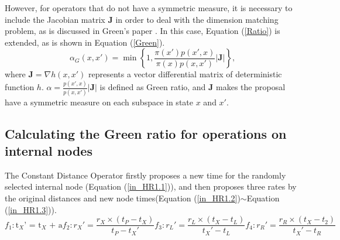 \documentclass{bmcart}
\begin{document}
\begin{backmatter}
However, for operators that do not have a symmetric measure, it is necessary to include the Jacobian matrix ${\mathbf{J}}$  in order to deal with the dimension matching problem, as is discussed in Green's paper \cite{green1995reversible}. In this case, Equation (\ref{Ratio}) is extended, as is shown in Equation (\ref{Green}).
\begin{equation}\label{Green}
{\alpha_G}(x, x') = \min \left\{ {1,\frac{{\pi (x'){p}(x',x)}}{{\pi (x){p}(x,x')}}}\left|{\mathbf{J}}\right| \right\} \text{,}
\end{equation}
where ${\mathbf{J}} = {\nabla h(x, x')}$ represents a vector differential matrix of deterministic function $h$. $\alpha = \frac{{p}(x',x)}{{p}(x,x')}\left|{\mathbf{J}}\right|$ is defined as Green ratio, and ${\mathbf{J}}$ makes the proposal have a symmetric measure on each subspace in state $x$ and $x'$.

\subsection*{Calculating the Green ratio for operations on internal nodes}
The Constant Distance Operator firstly proposes a new time for the randomly selected internal node (Equation (\ref{in_HR1.1})), and then proposes three rates by the original distances and new node times(Equation (\ref{in_HR1.2})$\sim$Equation (\ref{in_HR1.3})).
\begin{subequations}\label{in_HR1}
\begin{equation}\label{in_HR1.1}
{f_1}:{{\text{t}}_X}{\text{'  =  }}{{\text{t}}_X}{\text{  +  a}}
\end{equation}
\begin{equation}\label{in_HR1.2}
{f_2}:{r_X}' = \frac{{{r_X} \times ({t_P} - {t_X})}}{{{t_P} - {t_X}'}}
\end{equation}
\begin{equation}
{f_3}:{r_L}' = \frac{{{r_L} \times ({t_X} - {t_L})}}{{{t_X}' - {t_L}}}
\end{equation}
\begin{equation}\label{in_HR1.3}
{f_4}:{r_R}' = \frac{{{r_R} \times ({t_X} - {t_2})}}{{{t_X}' - {t_R}}}
\end{equation}
\end{subequations}


\end{backmatter}
\end{document}
